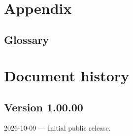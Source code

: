 \documentclass[a4paper,10pt,bibtotoc]{scrartcl}
\begin{document}
\clearpage




\clearpage


\appendix
\section*{Appendix}

\subsection*{Glossary}
\label{sec:glossary}



\clearpage






\section*{Document history}

\subsection*{Version 1.00.00}
2026-10-09 --- Initial public release.
\end{document}
